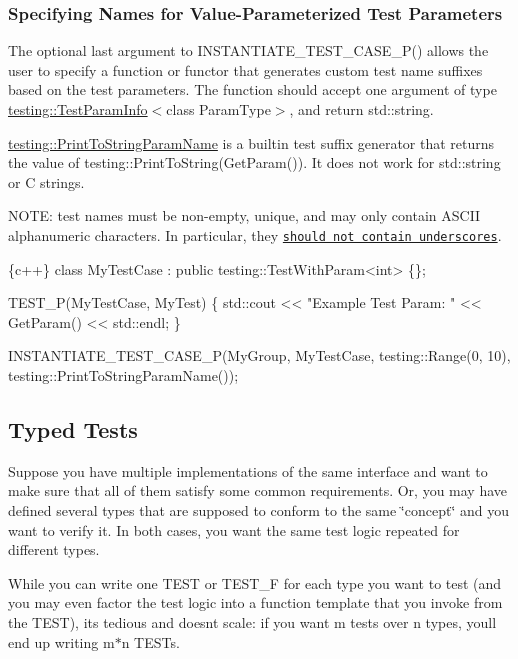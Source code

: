 \subsubsection*{Specifying Names for Value-\/\+Parameterized Test Parameters}

The optional last argument to {\ttfamily I\+N\+S\+T\+A\+N\+T\+I\+A\+T\+E\+\_\+\+T\+E\+S\+T\+\_\+\+C\+A\+S\+E\+\_\+\+P()} allows the user to specify a function or functor that generates custom test name suffixes based on the test parameters. The function should accept one argument of type {\ttfamily \hyperlink{structtesting_1_1TestParamInfo}{testing\+::\+Test\+Param\+Info}$<$class Param\+Type$>$}, and return {\ttfamily std\+::string}.

{\ttfamily \hyperlink{structtesting_1_1PrintToStringParamName}{testing\+::\+Print\+To\+String\+Param\+Name}} is a builtin test suffix generator that returns the value of {\ttfamily testing\+::\+Print\+To\+String(\+Get\+Param())}. It does not work for {\ttfamily std\+::string} or C strings.

N\+O\+TE\+: test names must be non-\/empty, unique, and may only contain A\+S\+C\+II alphanumeric characters. In particular, they \href{https://g3doc.corp.google.com/third_party/googletest/googletest/g3doc/faq.md#no-underscores}{\tt should not contain underscores}.


\begin{DoxyCode}
\{c++\}
class MyTestCase : public testing::TestWithParam<int> \{\};

TEST\_P(MyTestCase, MyTest)
\{
  std::cout << "Example Test Param: " << GetParam() << std::endl;
\}

INSTANTIATE\_TEST\_CASE\_P(MyGroup, MyTestCase, testing::Range(0, 10),
                        testing::PrintToStringParamName());
\end{DoxyCode}


\subsection*{Typed Tests}

Suppose you have multiple implementations of the same interface and want to make sure that all of them satisfy some common requirements. Or, you may have defined several types that are supposed to conform to the same \char`\"{}concept\char`\"{} and you want to verify it. In both cases, you want the same test logic repeated for different types.

While you can write one {\ttfamily T\+E\+ST} or {\ttfamily T\+E\+S\+T\+\_\+F} for each type you want to test (and you may even factor the test logic into a function template that you invoke from the {\ttfamily T\+E\+ST}), it\textquotesingle{}s tedious and doesn\textquotesingle{}t scale\+: if you want {\ttfamily m} tests over {\ttfamily n} types, you\textquotesingle{}ll end up writing {\ttfamily m$\ast$n} {\ttfamily T\+E\+ST}s.

